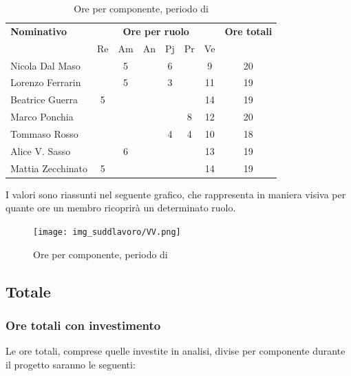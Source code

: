 \begin{table}[H]
	\centering
	\begin{tabular}{|l|c|c|c|c|c|c|c|}
		\hline
		\textbf{Nominativo} & 
		\multicolumn{6}{c|}{\textbf{Ore per ruolo}} & 
		\textbf{Ore totali} \\
		& Re & Am & An & Pj & Pr & Ve & \\
		\hline
		Nicola Dal Maso & &5 & &6 & &9 & 20 \\
		Lorenzo Ferrarin & &5 & &3 & &11 & 19 \\
		Beatrice Guerra &5 & & & & &14 & 19 \\
		Marco Ponchia & & & & &8 &12 & 20 \\
		Tommaso Rosso & & & &4 &4 &10 & 18 \\
		Alice V. Sasso & &6 & & & &13 & 19 \\
		Mattia Zecchinato &5 & & & & &14 & 19 \\
		\hline
	\end{tabular}
	\caption{Ore per componente, periodo di \VV{}}
\end{table}
I valori sono riassunti nel seguente grafico, che rappresenta in maniera visiva per quante ore un membro ricoprirà un determinato ruolo.
\begin{figure}[H]
	\centering
	\texttt{[image: img\_suddlavoro/VV.png]}
	\caption{Ore per componente, periodo di \VV{}}
\end{figure}

\subsection{Totale}
\subsubsection{Ore totali con investimento}
Le ore totali, comprese quelle investite in analisi, divise per componente durante il progetto saranno le seguenti:

